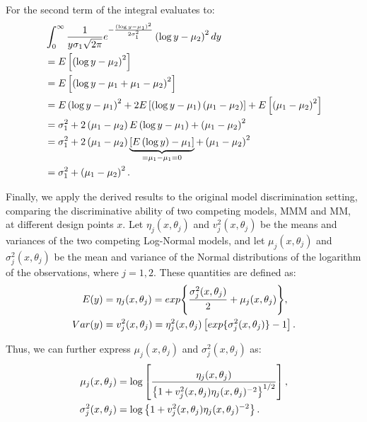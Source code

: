 For the second term of the integral evaluates to:
\begin{equation}\notag
\begin{aligned}
&\int_{0}^{\infty}\frac{1}{y \sigma_1 \sqrt{2\pi}} e^{-\frac{(\log y - \mu_1)^2}{2\sigma_1^2}}\left(\log y - \mu_2\right)^2dy\\
&=E\left[\left(\log y - \mu_2\right)^2\right]\\
&=E\left[\left(\log y -\mu_1 + \mu_1 - \mu_2\right)^2\right]\\
&=E\left(\log y - \mu_1\right)^2+2E\left[\left(\log y -\mu_1 \right)\left( \mu_1 - \mu_2\right)\right]+E\left[\left(\mu_1 - \mu_2\right)^2\right]\\
&=\sigma_1^2+2\left(\mu_1-\mu_2\right)E\left(\log y -\mu_1 \right)+\left(\mu_1 - \mu_2\right)^2\\
&=\sigma_1^2+2\left(\mu_1-\mu_2\right)\underbrace{\left[E\left(\log y\right) -\mu_1\right]}_{=\mu_1-\mu_1=0} +\left(\mu_1 - \mu_2\right)^2\\
&=\sigma_1^2+\left(\mu_1 - \mu_2\right)^2.
\end{aligned}
\end{equation}

\hspace*{8mm} Finally, we apply the derived results to the original model discrimination setting, comparing the discriminative ability of two competing models, MMM and MM, at different design points $x$. Let $\eta_j(x,\theta_j)$ and $v^2_j(x,\theta_j)$ be the means and variances of the two competing Log-Normal models, and let $\mu_j(x,\theta_j)$ and $\sigma^2_j(x,\theta_j)$ be the mean and variance of the Normal distributions of the logarithm of the observations, where $j=1,2$. These quantities are defined as:
\begin{align}
E(y)&=\eta_j(x,\theta_j)=exp{\left\{\frac{\sigma^2_j(x,\theta_j)}{2}+\mu_j(x,\theta_j)\right\}},  \notag\\
Var(y)&=v^2_j(x,\theta_j)=\eta^2_j(x,\theta_j)\left[ exp\lbrace \sigma^2_j(x,\theta_j) \rbrace -1 \right]. \notag
\end{align}

Thus, we can further express $\mu_j(x,\theta_j)$ and $\sigma^2_j(x,\theta_j)$ as:
\begin{align}
\mu_j(x,\theta_j)&=\log \left[ \frac{\eta_j(x,\theta_j)}{\left\{ 1+v^2_j(x,\theta_j)\eta_j(x,\theta_j)^{-2} \right\}^{1/2}}\right],  \notag\\
\sigma^2_j(x,\theta_j)&=\log \left\{ 1+v^2_j(x,\theta_j)\eta_j(x,\theta_j)^{-2}\right\}. \notag
\end{align}

